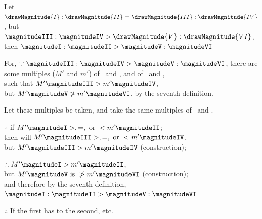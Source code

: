 \documentclass[booklanguage=english]{byrnebook}
\begin{document}
\begin{center}
Let $\drawMagnitude{I} : \drawMagnitude{II} = \drawMagnitude{III} : \drawMagnitude{IV}$, but $\magnitudeIII : \magnitudeIV > \drawMagnitude{V} : \drawMagnitude{VI}$,\\
then $\magnitudeI : \magnitudeII > \magnitudeV : \magnitudeVI$

For, $\because \magnitudeIII : \magnitudeIV > \magnitudeV : \magnitudeVI$, there are some multiples ($M'$ and $m'$) of \magnitudeIII\ and \magnitudeV, and of \magnitudeIV\ and \magnitudeVI,\\ %
such that $M' \magnitudeIII > m' \magnitudeIV$,\\
but $M' \magnitudeV \ngtr m' \magnitudeVI$, by the seventh definition. %

Let these multiples be taken, and take the same multiples of \magnitudeI\ and \magnitudeII.

$\therefore$  if $M' \magnitudeI >, =, \mbox{ or } < m' \magnitudeII$;\\
then will $M' \magnitudeIII >, =, \mbox{ or } < m' \magnitudeIV$,\\
but $M' \magnitudeIII > m' \magnitudeIV$ (construction);

$\therefore M' \magnitudeI > m' \magnitudeII$,\\
but $M' \magnitudeV \mbox{ is } \ngtr m' \magnitudeVI$ (construction);\\ %
and therefore by the seventh definition,\\
$\magnitudeI : \magnitudeII > \magnitudeV : \magnitudeVI$

$\therefore$ If the first has to the second, etc.
\end{center}

\vfill\pagebreak

\label{prop:V.XIV}
\end{document}
